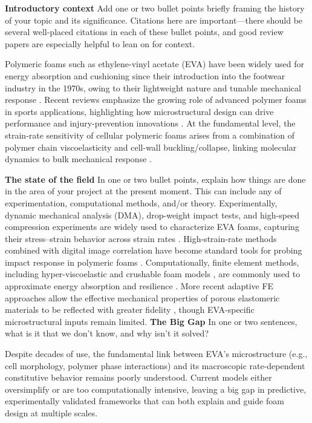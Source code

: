 \renewcommand{\outlinei}{enumerate}
\renewcommand{\outlineii}{itemize}
\begin{outline}
    \1 \textbf{Introductory context}
        \2 Add one or two bullet points briefly framing the history of your topic and its significance. 
        \2 Citations here are important---there should be several well-placed citations in each of these bullet points, and good review papers are especially helpful to lean on for context. 

        \2 Polymeric foams such as ethylene-vinyl acetate (EVA) have been widely used for energy absorption and cushioning since their introduction into the footwear industry in the 1970s, owing to their lightweight nature and tunable mechanical response \cite{tomin2021polymer, lunchev2022eva, sun2020footwear}. 
        \2 Recent reviews emphasize the growing role of advanced polymer foams in sports applications, highlighting how microstructural design can drive performance and injury-prevention innovations \cite{tomin2021polymer, desouza2023polymeric}. 
        \2 At the fundamental level, the strain-rate sensitivity of cellular polymeric foams arises from a combination of polymer chain viscoelasticity and cell-wall buckling/collapse, linking molecular dynamics to bulk mechanical response \cite{desouza2023polymeric}.  

    \1 \textbf{The state of the field}
        \2 In one or two bullet points, explain how things are done in the area of your project at the present moment. 
        \2 This can include any of experimentation, computational methods, and/or theory.
         \2 Experimentally, dynamic mechanical analysis (DMA), drop-weight impact tests, and high-speed compression experiments are widely used to characterize EVA foams, capturing their stress--strain behavior across strain rates \cite{chen2023eva}. High-strain-rate methods combined with digital image correlation have become standard tools for probing impact response in polymeric foams \cite{liu2014impact, koohbor2016dynamic}.
        \2 Computationally, finite element methods, including hyper-viscoelastic and crushable foam models \cite{fazekas2018hyper}, are commonly used to approximate energy absorption and resilience \cite{li2019eva}. More recent adaptive FE approaches allow the effective mechanical properties of porous elastomeric materials to be reflected with greater fidelity \cite{nazari2022adaptive}, though EVA-specific microstructural inputs remain limited. 
    \1 \textbf{The Big Gap}
        \2 In one or two sentences, what is it that we don't know, and why isn't it solved? 

        \2 Despite decades of use, the fundamental link between EVA’s microstructure (e.g., cell morphology, polymer phase interactions) and its macroscopic rate-dependent constitutive behavior remains poorly understood. 
        \2 Current models either oversimplify or are too computationally intensive, leaving a big gap in predictive, experimentally validated frameworks that can both explain and guide foam design at multiple scales.

\end{outline}

